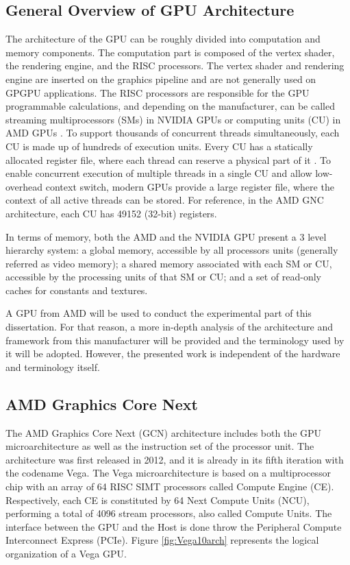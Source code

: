 \subsection{General Overview of GPU Architecture}
The architecture of the GPU can be roughly divided into computation and memory components. The computation part is composed of the vertex shader, the rendering engine, and the RISC processors. The vertex shader and rendering engine are inserted on the graphics pipeline and are not generally used on GPGPU applications. The RISC processors are responsible for the GPU programmable calculations, and depending on the manufacturer, can be called streaming multiprocessors (SMs) in NVIDIA GPUs \cite{nvidia_cuda_nodate} or computing units (CU) in AMD GPUs \cite{amd_amd_nodate}. To support thousands of concurrent threads simultaneously, each CU is made up of hundreds of execution units. Every CU has a statically allocated register file, where each thread can reserve a physical part of it \cite{jing_energy-efficient_2013}. To enable concurrent execution of multiple threads in a single CU and allow low-overhead context switch, modern GPUs provide a large register file, where the context of all active threads can be stored. For reference, in the AMD GNC architecture, each CU has 49152 (32-bit) registers.

In terms of memory, both the AMD and the NVIDIA GPU present a 3 level hierarchy system: a global memory, accessible by all processors units (generally referred as video memory); a shared memory associated with each SM or CU, accessible by the processing units of that SM or CU; and a set of read-only caches for constants and textures.

A GPU from AMD will be used to conduct the experimental part of this dissertation. For that reason, a more in-depth analysis of the architecture and framework from this manufacturer will be provided and the terminology used by it will be adopted. However, the presented work is independent of the hardware and terminology itself.

\subsection{AMD Graphics Core Next}

The AMD Graphics Core Next (GCN) \cite{amd_radeons_nodate}  architecture includes both the GPU microarchitecture as well as the instruction set of the processor unit. The architecture was first released in 2012, and it is already in its fifth iteration with the codename Vega. The Vega microarchitecture is based on a multiprocessor chip with an array of 64 RISC SIMT processors called Compute Engine (CE). Respectively, each CE is constituted by 64 Next Compute Units (NCU), performing a total of 4096 stream processors, also called Compute Units. The interface between the GPU and the Host is done throw the Peripheral Compute Interconnect Express (PCIe). Figure \ref{fig:Vega10arch} represents the logical organization of a Vega GPU.  

